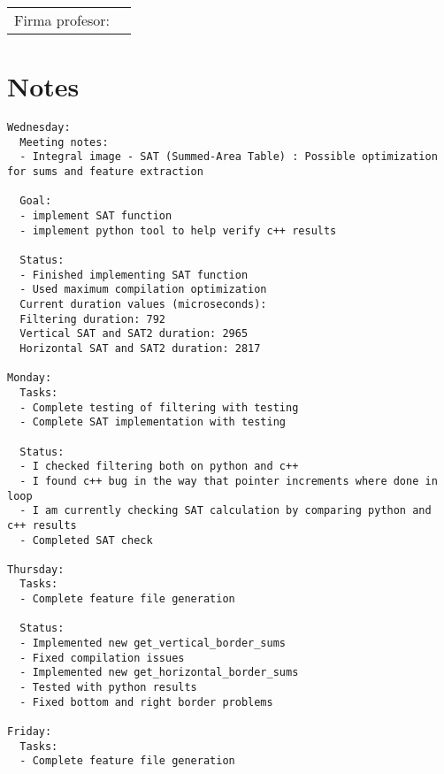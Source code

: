 \documentclass[12pt,oneside]{book}
\begin{document}
  \vfill

  \begin{tabular}{p{3 cm} p{10 cm}}
    Firma profesor: & \\
    \cline{2-2}
  \end{tabular}

  \newpage

  \section*{Notes}
  \setlength\parindent{0pt}

\begin{lstlisting}
Wednesday:
  Meeting notes:
  - Integral image - SAT (Summed-Area Table) : Possible optimization for sums and feature extraction

  Goal:
  - implement SAT function
  - implement python tool to help verify c++ results

  Status:
  - Finished implementing SAT function
  - Used maximum compilation optimization
  Current duration values (microseconds):
  Filtering duration: 792
  Vertical SAT and SAT2 duration: 2965
  Horizontal SAT and SAT2 duration: 2817

Monday:
  Tasks:
  - Complete testing of filtering with testing
  - Complete SAT implementation with testing

  Status:
  - I checked filtering both on python and c++
  - I found c++ bug in the way that pointer increments where done in loop
  - I am currently checking SAT calculation by comparing python and c++ results
  - Completed SAT check

Thursday:
  Tasks:
  - Complete feature file generation

  Status:
  - Implemented new get_vertical_border_sums
  - Fixed compilation issues
  - Implemented new get_horizontal_border_sums
  - Tested with python results
  - Fixed bottom and right border problems

Friday:
  Tasks:
  - Complete feature file generation


\end{lstlisting}
\end{document}
